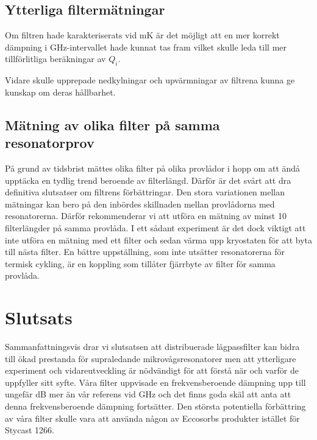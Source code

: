 \documentclass[main.tex]{subfiles}
\begin{document}
\subsection{Ytterliga filtermätningar}
Om filtren hade karakteriserats vid \unit[10]{mK} är det möjligt att en mer korrekt dämpning i \unit[4-8]{GHz}-intervallet hade kunnat tas fram vilket skulle leda till mer tillförlitliga beräkningar av $Q_i$.


Vidare skulle upprepade nedkylningar och upvärmningar av filtrena kunna ge kunskap om deras hållbarhet.

\subsection{Mätning av olika filter på samma resonatorprov}
På grund av tidsbrist mättes olika filter på olika provlådor i hopp om att ändå upptäcka en tydlig trend beroende av filterlängd. Därför är det svårt att dra definitiva slutsatser om filtrens förbättringar. Den stora variationen mellan mätningar kan bero på den inbördes skillnaden mellan provlådorna med resonatorerna. Därför rekommenderar vi att utföra en mätning av minst 10 filterlängder på samma provlåda. I ett sådant experiment är det dock viktigt att inte utföra en mätning med ett filter och sedan värma upp kryostaten för att byta till nästa filter. En bättre uppställning, som inte utsätter resonatorerna för termisk cykling, är en koppling som tillåter fjärrbyte av filter för samma provlåda.

\section{Slutsats}
Sammanfattningsvis drar vi slutsatsen att distribuerade lågpassfilter kan bidra till ökad prestanda för supraledande mikrovågsresonatorer men att ytterligare experiment och vidareutveckling är nödvändigt för att förstå när och varför de uppfyller sitt syfte.  Våra filter uppvisade en frekvensberoende dämpning upp till ungefär \unit[10]{dB} mer än vår referens vid \unit[50]{GHz} och det finns goda skäl att anta att denna frekvensberoende dämpning fortsätter. Den största potentiella förbättring av våra filter skulle vara att använda någon av Eccosorbs produkter istället för Stycast 1266.
\end{document}
